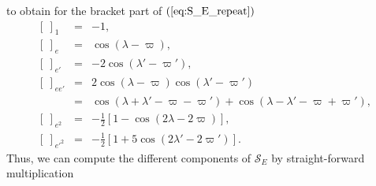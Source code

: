 \documentclass [12pt, a4paper] {article}
\begin{document}
to obtain for the bracket part of $(\ref{eq:S_E_repeat})$
\begin {eqnarray}
    \left[\:\right]_1 &=& -1, 
    \\
    \left[\:\right]_{e} &=& \cos(\lambda - \varpi),
    \\
    \left[\:\right]_{e'} &=& -2\cos(\lambda' - \varpi'),
    \\
    \left[\:\right]_{ee'} &=& 2\cos(\lambda - \varpi)\cos(\lambda' - \varpi') 
    \\\nonumber 
    &=& 
    \cos(\lambda + \lambda' - \varpi - \varpi') 
    + 
    \cos(\lambda - \lambda' - \varpi + \varpi'),
    \\
    \left[\:\right]_{e^2} &=& - \frac{1}{2}[1 - \cos(2\lambda - 2\varpi)],
    \\
    \left[\:\right]_{e'^2} &=& - \frac{1}{2}[1 + 5\cos(2\lambda' - 2\varpi')].
\end {eqnarray}
Thus, we can compute the different components of $\mathcal{S}_E$ by straight-forward 
multiplication
\end{document}
